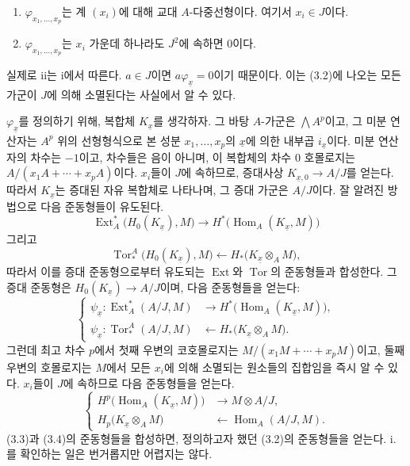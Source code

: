 \documentclass[11pt,twoside,openany]{book}
\numberwithin{equation}{section}
\newcommand{\sourceunit}{front}
\newcommand{\src}[1]{%
  \phantomsection\hypertarget{src:\sourceunit:#1}{}%
  \marginpar{\raggedleft\footnotesize\sffamily #1}%
}
\theoremstyle{plain}
\theoremstyle{definition}
\theoremstyle{remark}
\begin{document}
\src{174}
\begin{enumerate}
\item[\textup{i.}] $\varphi_{x_1,\ldots,x_p}$는
계 $(x_i)$에 대해 교대 $A$-다중선형이다. 여기서 $x_i\in J$이다.
\item[\textup{ii.}] $\varphi_{x_1,\ldots,x_p}$는 $x_i$ 가운데 하나라도
$J^{2}$에 속하면 $0$이다.
\end{enumerate}
실제로 ii는 i에서 따른다. $a\in J$이면 $a\varphi_{\underline{x}}=0$이기 때문이다.
이는 (3.2)에 나오는 모든 가군이
$J$에 의해 소멸된다는 사실에서 알 수 있다.

$\varphi_{\underline{x}}$를 정의하기 위해, 복합체
$K_{\underline{x}}$를 생각하자. 그 바탕 $A$-가군은 $\bigwedge A^{p}$이고,
그 미분 연산자는 $A^{p}$ 위의 선형형식으로 본
성분 $x_1,\ldots,x_p$의 $\underline{x}$에 의한 내부곱 $i_{\underline{x}}$이다.
미분 연산자의 차수는 $-1$이고, 차수들은
음이 아니며, 이 복합체의 차수 $0$ 호몰로지는
$A/(x_1A+\cdots+x_pA)$이다. $x_i$들이 $J$에 속하므로,
증대사상 $K_{\underline{x},0}\longrightarrow A/J$를 얻는다. 따라서
$K_{\underline{x}}$는 증대된 자유 복합체로 나타나며, 그 증대 가군은
$A/J$이다. 잘 알려진 방법으로 다음 준동형들이 유도된다.
\[
\operatorname{Ext}_{A}^{*}\bigl(H_0(K_{\underline{x}}),M\bigr)
\longrightarrow
H^{*}\bigl(\operatorname{Hom}_{A}(K_{\underline{x}},M)\bigr)
\]
그리고
\[
\operatorname{Tor}_{*}^{A}\bigl(H_0(K_{\underline{x}}),M\bigr)
\longleftarrow
H_{*}\bigl(K_{\underline{x}}\otimes_A M\bigr),
\]
따라서 이를 증대 준동형으로부터 유도되는 $\operatorname{Ext}$와
$\operatorname{Tor}$의 준동형들과 합성한다. 그 증대 준동형은
$H_0(K_{\underline{x}})\longrightarrow A/J$이며, 다음 준동형들을 얻는다:
\begin{equation}\tag{3.3}
\left\{
\begin{aligned}
\psi_{\underline{x}}:
\operatorname{Ext}_{A}^{*}(A/J,M)
&\longrightarrow H^{*}\bigl(\operatorname{Hom}_{A}(K_{\underline{x}},M)\bigr),\\
\psi_{\underline{x}}:
\operatorname{Tor}_{*}^{A}(A/J,M)
&\longleftarrow H_{*}\bigl(K_{\underline{x}}\otimes_A M\bigr).
\end{aligned}
\right.
\end{equation}
그런데 최고 차수 $p$에서 첫째 우변의 코호몰로지는
$M/(x_1M+\cdots+x_pM)$이고, 둘째 우변의 호몰로지는 $M$에서
모든 $x_i$에 의해 소멸되는 원소들의 집합임을 즉시 알 수 있다. $x_i$들이 $J$에 속하므로
다음 준동형들을 얻는다.
\begin{equation}\tag{3.4}
\left\{
\begin{aligned}
H^{p}\bigl(\operatorname{Hom}_{A}(K_{\underline{x}},M)\bigr)
&\longrightarrow M\otimes A/J,\\
H_{p}\bigl(K_{\underline{x}}\otimes_A M\bigr)
&\longleftarrow\operatorname{Hom}_{A}(A/J,M).
\end{aligned}
\right.
\end{equation}
(3.3)과 (3.4)의 준동형들을 합성하면, 정의하고자 했던 (3.2)의
준동형들을 얻는다. i.를 확인하는 일은 번거롭지만
어렵지는 않다.
\end{document}
